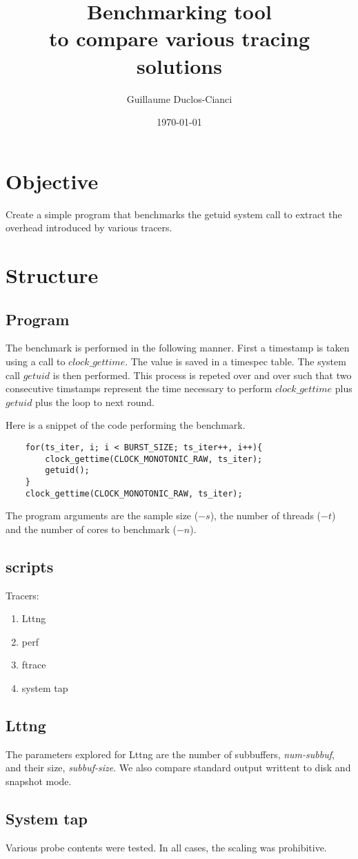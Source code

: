\documentclass{article}
\author{Guillaume Duclos-Cianci}
\date{\today}
\title{Benchmarking tool\\to compare various tracing solutions}
\begin{document}
\maketitle

\section{Objective}

Create a simple program that benchmarks the getuid system call to extract the overhead introduced by various tracers.

\section{Structure}

\subsection{Program}

The benchmark is performed in the following manner. First a timestamp is taken using a call to $clock\_gettime$. The value is saved in a timespec table. The system call $getuid$ is then performed. This process is repeted over and over such that two consecutive timstamps represent the time necessary to perform $clock\_gettime$ plus $getuid$ plus the loop to next round.

Here is a snippet of the code performing the benchmark.
\begin{lstlisting}
    for(ts_iter, i; i < BURST_SIZE; ts_iter++, i++){
        clock_gettime(CLOCK_MONOTONIC_RAW, ts_iter);
        getuid();
    }   
    clock_gettime(CLOCK_MONOTONIC_RAW, ts_iter);
\end{lstlisting}

The program arguments are the sample size ($-s$), the number of threads ($-t$) and the number of cores to benchmark ($-n$).

\subsection{scripts}

Tracers:
\begin{enumerate}
	\item Lttng
	\item perf
	\item ftrace
	\item system tap
\end{enumerate}

\subsection{Lttng}

The parameters explored for Lttng are the number of subbuffers, \textit{num-subbuf}, and their size, \textit{subbuf-size}. We also compare standard output writtent to disk and snapshot mode.

\subsection{System tap}

Various probe contents were tested. In all cases, the scaling was prohibitive.
\end{document}
